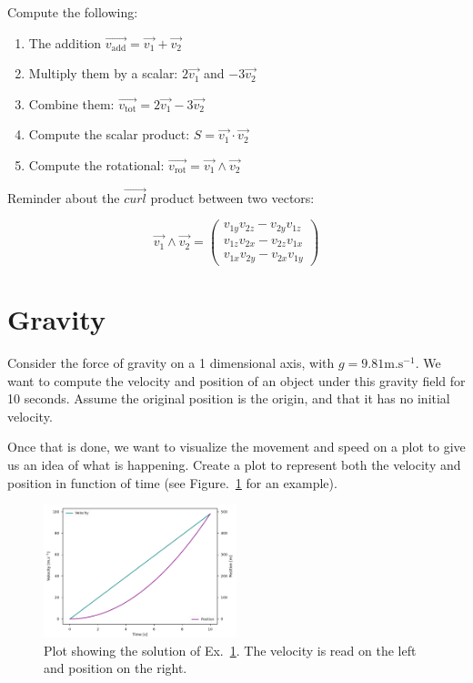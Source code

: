 \documentclass[twocolumn]{article}
\begin{document}
Compute the following:
\begin{enumerate}
    \item The addition $\overrightarrow{v_{\mathrm{add}}} = \overrightarrow{v_1} + \overrightarrow{v_2}$
    \item Multiply them by a scalar: $2\overrightarrow{v_1}$ and $-3\overrightarrow{v_2}$
    \item Combine them: $\overrightarrow{v_{\mathrm{tot}}} = 2\overrightarrow{v_1} - 3\overrightarrow{v_2}$
    \item Compute the scalar product: $S = \overrightarrow{v_1}\cdot\overrightarrow{v_2}$
    \item Compute the rotational: $\overrightarrow{v_{\mathrm{rot}}} = \overrightarrow{v_1}\wedge\overrightarrow{v_2}$
\end{enumerate}

Reminder about the $\overrightarrow{curl}$ product between two vectors:

\begin{equation}
     \overrightarrow{v_1}\wedge\overrightarrow{v_2} = \begin{pmatrix}
        v_{1y}v_{2z} - v_{2y}v_{1z}\\
        v_{1z}v_{2x} - v_{2z}v_{1x}\\
        v_{1x}v_{2y} - v_{2x}v_{1y}
    \end{pmatrix}
\end{equation}

\section{Gravity}\label{sec:gravity}

Consider the force of gravity on a 1 dimensional axis, with $g=9.81\mathrm{m.s^{-1}}$. We want to compute the velocity and position of an object under this gravity field for 10 seconds. Assume the original position is the origin, and that it has no initial velocity.

Once that is done, we want to visualize the movement and speed on a plot to give us an idea of what is happening. Create a plot to represent both the velocity and position in function of time (see Figure.~\ref{fig:gravity_example} for an example).

\begin{figure}
\centering
\includegraphics[width=0.5\textwidth]{figures/gravity.pdf}
\caption{Plot showing the solution of Ex.~\ref{sec:gravity}. The velocity is read on the left and position on the right.}
\label{fig:gravity_example}
\end{figure}
\end{document}
